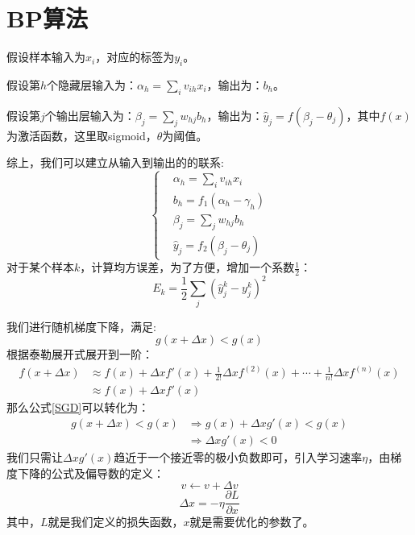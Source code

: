 \documentclass[11pt]{report}
\begin{document}
\chapter{BP算法}
假设样本输入为$x_i$，对应的标签为$y_i$。
\par
假设第$h$个隐藏层输入为：$\alpha_h=\sum_i v_{ih}x_i$，输出为：$b_h$。
\par
假设第$j$个输出层输入为：$\beta_j=\sum_j w_{hj}b_h$，输出为：$\hat{y}_j=f(\beta_j-\theta_j)$，其中$f(x)$为激活函数，这里取sigmoid，$\theta$为阈值。
\par
综上，我们可以建立从输入到输出的的联系:
\begin{equation}
\label{NN_process}
	\begin{cases}
		& \alpha_h=\sum_i v_{ih}x_i\\
		& b_h=f_1(\alpha_h-\gamma_h)\\
		& \beta_j=\sum_j w_{hj}b_h\\
		& \hat{y}_j=f_2(\beta_j-\theta_j)
	\end{cases}
\end{equation}
对于某个样本$k$，计算均方误差，为了方便，增加一个系数$\frac{1}{2}$：
\begin{equation}
	E_k=\frac{1}{2}\sum_j(\hat{y}_j^k-y_j^k)^2
\end{equation}
\par
我们进行随机梯度下降，满足:
\begin{equation}
\label{SGD}
	g(x+\Delta x)<g(x)
\end{equation}
根据泰勒展开式展开到一阶：
\begin{equation}
\begin{split}
	f(x+\Delta x)&\approx f(x)+\Delta xf'(x)+\frac{1}{2!}\Delta xf^{(2)}(x)+\cdots+\frac{1}{n!}\Delta xf^{(n)}(x)\\
	&\approx f(x)+\Delta xf'(x)
\end{split}
\end{equation}
那么公式\ref{SGD}可以转化为：
\begin{equation}
\begin{split}
	g(x+\Delta x)<g(x)&\Rightarrow g(x)+\Delta xg'(x)<g(x)\\
	&\Rightarrow \Delta xg'(x)<0
\end{split}
\end{equation}
我们只需让$\Delta xg'(x)$趋近于一个接近零的极小负数即可，引入学习速率$\eta$，由梯度下降的公式及偏导数的定义：
\begin{equation}
	v\leftarrow v+\Delta v
\end{equation}
\begin{equation}
\label{optimal_target}
	\Delta x =-\eta\frac{\partial L}{\partial x}
\end{equation}
其中，$L$就是我们定义的损失函数，$x$就是需要优化的参数了。
\end{document}
